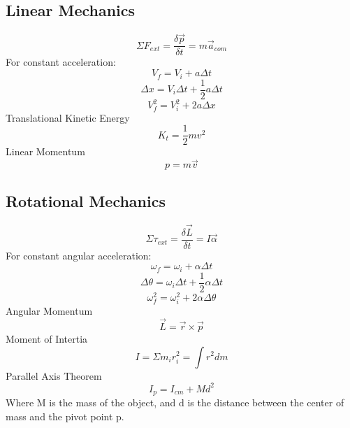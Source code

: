\documentclass{article}
\begin{document}
{\subsection{Linear Mechanics}
\begin{equation}\Sigma F_{ext} = \frac{\delta \vec{p}}{\delta t} = m\vec{a}_{com}\end{equation}
For constant acceleration:
\begin{equation}V_{f} = V_{i} + a\Delta t\end{equation}
\begin{equation}\Delta x = V_{i} \Delta t + \frac{1}{2}a\Delta t\end{equation}
\begin{equation}V_{f}^2 = V_{i}^2 + 2a\Delta x\end{equation}
Translational Kinetic Energy
\begin{equation}K_{t} = \frac{1}{2}mv^2\end{equation}
Linear Momentum
\begin{equation}p = m\vec{v}\end{equation}

\subsection{Rotational Mechanics}
\begin{equation}\Sigma \tau _{ext} = \frac{\delta \vec{L}}{\delta t} = I\vec{\alpha}\end{equation}
For constant angular acceleration:
\begin{equation}\omega_{f} = \omega_{i} + \alpha\Delta t\end{equation}
\begin{equation}\Delta \theta = \omega_{i} \Delta t + \frac{1}{2}\alpha\Delta t\end{equation}
\begin{equation}\omega_{f}^2 = \omega_{i}^2 + 2\alpha\Delta \theta\end{equation}
Angular Momentum
\begin{equation}\vec{L} = \vec{r} \times \vec{p}\end{equation}
Moment of Intertia
\begin{equation} I = \Sigma m_{i}r_{i}^2 = \int{r^2 dm}\end{equation}
Parallel Axis Theorem
\begin{equation}
  I_p = I_{cm} + Md^2
\end{equation}
Where M is the mass of the object, and d is the distance between the center of mass and the pivot point p. 

}
\end{document}
